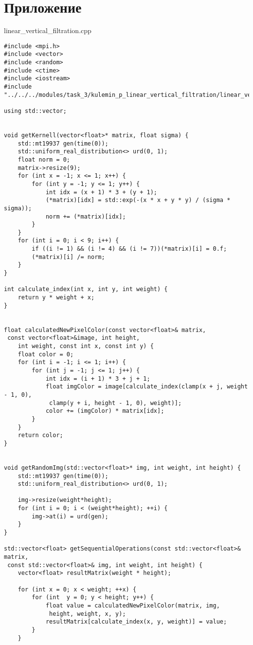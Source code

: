 \documentclass{report}
\begin{document}
\section*{Приложение}

linear\_vertical\_filtration.cpp 
\begin{lstlisting}
#include <mpi.h>
#include <vector>
#include <random>
#include <ctime>
#include <iostream>
#include "../../../modules/task_3/kulemin_p_linear_vertical_filtration/linear_vectrical_filtration.h"

using std::vector;


void getKernell(vector<float>* matrix, float sigma) {
    std::mt19937 gen(time(0));
    std::uniform_real_distribution<> urd(0, 1);
    float norm = 0;
    matrix->resize(9);
    for (int x = -1; x <= 1; x++) {
        for (int y = -1; y <= 1; y++) {
            int idx = (x + 1) * 3 + (y + 1);
            (*matrix)[idx] = std::exp(-(x * x + y * y) / (sigma * sigma));
            norm += (*matrix)[idx];
        }
    }
    for (int i = 0; i < 9; i++) {
        if ((i != 1) && (i != 4) && (i != 7))(*matrix)[i] = 0.f;
        (*matrix)[i] /= norm;
    }
}

int calculate_index(int x, int y, int weight) {
    return y * weight + x;
}


float calculatedNewPixelColor(const vector<float>& matrix,
 const vector<float>&image, int height,
    int weight, const int x, const int y) {
    float color = 0;
    for (int i = -1; i <= 1; i++) {
        for (int j = -1; j <= 1; j++) {
            int idx = (i + 1) * 3 + j + 1;
            float imgColor = image[calculate_index(clamp(x + j, weight - 1, 0),
             clamp(y + i, height - 1, 0), weight)];
            color += (imgColor) * matrix[idx];
        }
    }
    return color;
}


void getRandomImg(std::vector<float>* img, int weight, int height) {
    std::mt19937 gen(time(0));
    std::uniform_real_distribution<> urd(0, 1);

    img->resize(weight*height);
    for (int i = 0; i < (weight*height); ++i) {
        img->at(i) = urd(gen);
    }
}

std::vector<float> getSequentialOperations(const std::vector<float>& matrix,
 const std::vector<float>& img, int weight, int height) {
    vector<float> resultMatrix(weight * height);

    for (int x = 0; x < weight; ++x) {
        for (int  y = 0; y < height; y++) {
            float value = calculatedNewPixelColor(matrix, img,
             height, weight, x, y);
            resultMatrix[calculate_index(x, y, weight)] = value;
        }
    }


\end{lstlisting}
\end{document}
